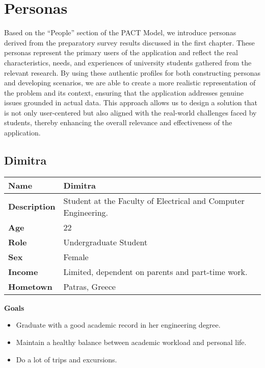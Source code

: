 \section{Personas}

Based on the ``People'' section of the PACT Model, we introduce personas derived from the preparatory survey results discussed in the first chapter. These personas represent the primary users of the application and reflect the real characteristics, needs, and experiences of university students gathered from the relevant research. By using these authentic profiles for both constructing personas and developing scenarios, we are able to create a more realistic representation of the problem and its context, ensuring that the application addresses genuine issues grounded in actual data. This approach allows us to design a solution that is not only user-centered but also aligned with the real-world challenges faced by students, thereby enhancing the overall relevance and effectiveness of the application.

\subsection{Dimitra}

\FloatBarrier
\begin{table}[ht]
\centering
\begin{tabular}{|l|p{11cm}|}
\hline
\textbf{Name} & Dimitra \\ \hline
\textbf{Description} & Student at the Faculty of Electrical and Computer Engineering. \\ \hline
\textbf{Age} & 22 \\ \hline
\textbf{Role} & Undergraduate Student \\ \hline
\textbf{Sex} & Female \\ \hline
\textbf{Income} & Limited, dependent on parents and part-time work. \\ \hline
\textbf{Hometown} & Patras, Greece \\ \hline
\end{tabular}
\label{tab:persona_dimitra}
\end{table}
\FloatBarrier

\begin{center} \textbf{Goals} \end{center}
\begin{itemize}
    \item Graduate with a good academic record in her engineering degree.
    \item Maintain a healthy balance between academic workload and personal life.
    \item Do a lot of trips and excursions.
\end{itemize}

